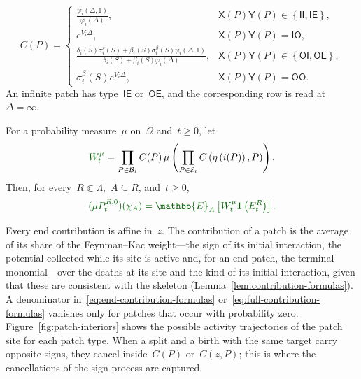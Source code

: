 \documentclass[EJP,preprint,NODS,nobera]{ejpecp}
\newcommand{\E}{\mathbb{E}}
\newcommand{\bb}[1]{\left(#1\right)}
\newcommand{\Cb}[1]{\left[#1\right]}
\newcommand{\cb}[1]{\left\{#1\right\}}
\newcommand{\ind}{\mathbf{1}}
\newcommand{\chg}[1]{{\color{changegreen}#1}}
\begin{document}
{\begin{definition}
\begin{enumerate}[label=\textup{(\alph*)}]
\begin{equation}
\label{eq:full-contribution-formulas}
C(P)
=
\begin{cases}
\displaystyle
\frac{\psi_i(\Delta,1)}{\varphi_i(\Delta)},
&\mathsf X(P)\mathsf Y(P)\in\cb{\mathsf{II},\mathsf{IE}},
\\[1.4em]
e^{V_i\Delta},
&\mathsf X(P)\mathsf Y(P)=\mathsf{IO},
\\[0.8em]
\displaystyle
\frac{
\delta_i(S)\sigma_i^\delta(S)
+
\beta_i(S)\sigma_i^\beta(S)\psi_i(\Delta,1)
}{
\delta_i(S)+\beta_i(S)\varphi_i(\Delta)
},
&\mathsf X(P)\mathsf Y(P)\in\cb{\mathsf{OI},\mathsf{OE}},
\\[1.4em]
\sigma_i^\beta(S)e^{V_i\Delta},
&\mathsf X(P)\mathsf Y(P)=\mathsf{OO}.
\end{cases}
\end{equation}
An infinite patch has type~$\mathsf{IE}$ or~$\mathsf{OE}$, and the
corresponding row is read at~$\Delta=\infty$.
\end{enumerate}
\end{definition}}

\begin{theorem}
\label{thm:patch-representation}
\chg{For a probability measure~$\mu$ on~$\Omega$ and~$t\geq0$, let}
\begin{equation}
\label{eq:finite-horizon-weight}
\chg{W_t^\mu}
=
\prod_{P\in\mathcal B_t}C(P)\,
\mu\bb{
\prod_{P\in\mathcal E_t}C\bb{\eta\bb{i(P)},P}
}.
\end{equation}
\chg{Then, for every~$R\Subset\Lambda$,~$A\subseteq R$, and~$t\geq0$,}
\begin{equation}
\label{eq:patch-representation}
\chg{(\mu P_t^{R,0})(\chi_A)
=
\E_A\Cb{W_t^\mu\ind\bb{E_t^R}}.}
\end{equation}
\end{theorem}

\chg{\begin{remark}
\label{rem:meaning-contributions}
Every end contribution is affine in~$z$. The contribution of a patch is the
average of its share of the Feynman--Kac weight---the sign of its initial
interaction, the potential collected while its site is active and, for an end
patch, the terminal monomial---over the deaths at its site and the kind of its
initial interaction, given that these are consistent with the skeleton
(Lemma~\ref{lem:contribution-formulas}). A denominator
in~\eqref{eq:end-contribution-formulas}
or~\eqref{eq:full-contribution-formulas} vanishes only for patches that occur
with probability zero. Figure~\ref{fig:patch-interiors} shows the possible
activity trajectories of the patch site for each patch type. When a split and
a birth with the same target carry opposite signs, they cancel inside~$C(P)$
or~$C(z,P)$; this is where the cancellations of the sign process are
captured.
\end{remark}}
\end{document}
